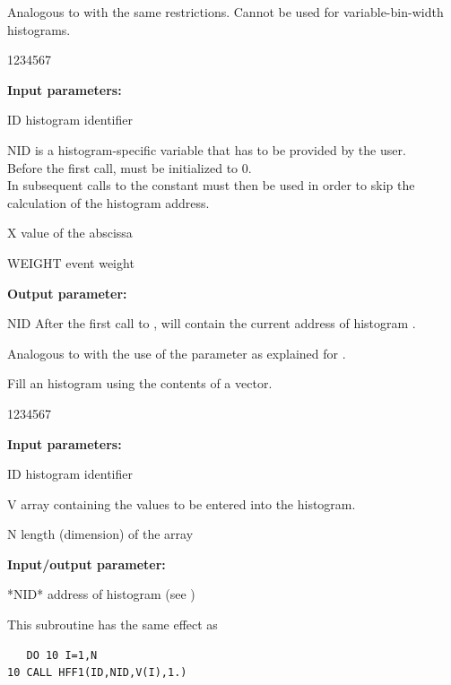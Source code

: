 \Action 
Analogous to  with the same restrictions.
Cannot be used for variable-bin-width histograms.
 
\begin{DLttc}{1234567}
\item[{\rm\bf Input parameters:}]
\item[ID]     histogram identifier
\item[NID]    is a histogram-specific variable that has to
              be provided by the user.\\
              Before the first call,  must be initialized to 0.\\
              In subsequent calls to  the constant
               must then be used in order
              to skip the calculation of the histogram address.
\item[X]      value of the abscissa
\item[WEIGHT] event weight
\item[{\rm\bf Output parameter:}]
\item[NID]    After the first call to ,
               will contain the current address
              of histogram .
\end{DLttc}
 
 
\Action Analogous to  with the use of the parameter
 as explained for . 
 
 
 
\Action Fill an histogram using the contents of a vector.
 
\begin{DLttc}{1234567}
\item[{\rm\bf Input parameters:}]
\item[ID] histogram identifier
\item[V] array containing the values to be entered into the histogram.
\item[N] length (dimension) of the array 
\item[{\rm\bf Input/output parameter:}]
\item[*NID*] address of histogram (see )
\end{DLttc}
 
This subroutine has the same effect as
 
\begin{verbatim}
   DO 10 I=1,N
10 CALL HFF1(ID,NID,V(I),1.)
\end{verbatim}
 
